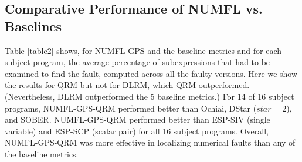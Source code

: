 \subsection{Comparative Performance of NUMFL vs. Baselines}\label{VD}
Table \ref{table2} shows, for NUMFL-GPS and the baseline metrics and for each subject program, the average percentage of subexpressions that had to be examined to find the fault, computed across all the faulty versions.  Here we show the results for QRM but not for DLRM, which QRM outperformed.  (Nevertheless, DLRM outperformed the 5 baseline metrics.)  For 14 of 16 subject programs, NUMFL-GPS-QRM performed better than Ochiai, DStar ($star=2$), and SOBER. NUMFL-GPS-QRM performed better than ESP-SIV (single variable) and ESP-SCP (scalar pair) for all 16 subject programs.  Overall, NUMFL-GPS-QRM was more effective in localizing numerical faults than any of the baseline metrics.
